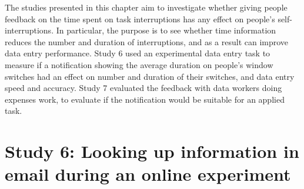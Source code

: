 The studies presented in this chapter aim to investigate whether giving people feedback on the time spent on task interruptions has any effect on people's self-interruptions. In particular, the purpose is to see whether time information reduces the number and duration of interruptions, and as a result can improve data entry performance. Study 6 used an experimental data entry task to measure if a notification showing the average duration on people's window switches had an effect on number and duration of their switches, and data entry speed and accuracy. Study 7 evaluated the feedback with data workers doing expenses work, to evaluate if the notification would be suitable for an applied task.


\section{Study 6: Looking up information in email during an online experiment}


